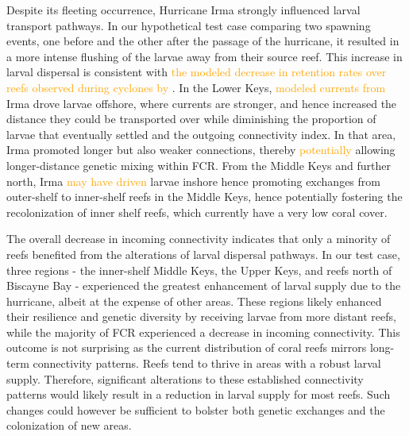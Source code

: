 \documentclass[fleqn,10pt]{wlscirep}
\newcommand{\modif}[1]{\textcolor{orange}{#1}}
\begin{document}
Despite its fleeting occurrence, Hurricane Irma strongly influenced larval transport pathways. In our hypothetical test case comparing two spawning events, one before and the other after the passage of the hurricane, it resulted in a more intense flushing of the larvae away from their source reef. This increase in larval dispersal is consistent with \modif{the modeled decrease in retention rates over reefs observed during cyclones by} \cite{grimaldi2022hydrodynamic}. In the Lower Keys, \modif{modeled currents from} Irma drove larvae offshore, where currents are stronger, and hence increased the distance they could be transported over while diminishing the proportion of larvae that eventually settled and the outgoing connectivity index. In that area, Irma promoted longer but also weaker connections, thereby \modif{potentially} allowing longer-distance genetic mixing within FCR. From the Middle Keys and further north, Irma \modif{may have driven} larvae inshore hence promoting exchanges from outer-shelf to inner-shelf reefs in the Middle Keys, hence potentially fostering the recolonization of inner shelf reefs, which currently have a very low coral cover.

The overall decrease in incoming connectivity indicates that only a minority of reefs benefited from the alterations of larval dispersal pathways. In our test case, three regions - the inner-shelf Middle Keys, the Upper Keys, and reefs north of Biscayne Bay - experienced the greatest enhancement of larval supply due to the hurricane, albeit at the expense of other areas. These regions likely enhanced their resilience and genetic diversity by receiving larvae from more distant reefs, while the majority of FCR experienced a decrease in incoming connectivity. This outcome is not surprising as the current distribution of coral reefs mirrors long-term connectivity patterns. Reefs tend to thrive in areas with a robust larval supply. Therefore, significant alterations to these established connectivity patterns would likely result in a reduction in larval supply for most reefs. Such changes could however be sufficient to bolster both genetic exchanges and the colonization of new areas.
\end{document}
